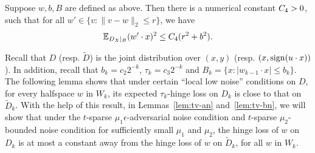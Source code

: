 \begin{lemma}
Suppose $w, b, B$ are defined as above. Then there is a numerical constant $C_4  > 0$, such that for all $w' \in \{v: \| v - w \|_2 \leq r \}$, we have
\begin{equation*}
 \mathbb{E}_{D_X|_B} (w' \cdot x)^2 \leq C_4 (r^2 + b^2).
\end{equation*}
\label{lem:variance}
\end{lemma}

Recall that $D$ (resp. $\tilde{D}$) is the joint distribution over $(x,y)$ (resp. $(x,\operatorname{sign}(u \cdot x))$). In addition, recall that $b_k = c_2 2^{-k}$, $\tau_k = c_3 2^{-k}$ and $B_k = \{ x: |w_{k-1} \cdot x| \leq b_k \}$.
The following lemma shows that under certain ``local low noise'' conditions on $D$, for every halfspace $w$ in $W_k$,
its expected $\tau_k$-hinge loss on $D_k$ is close to that on $\tilde{D}_k$. With the help of this result, in Lemmas~\ref{lem:tv-an} and~\ref{lem:tv-bn}, we will show that under the $t$-sparse $\mu_1 \epsilon$-adversarial noise condition and $t$-sparse $\mu_2$-bounded noise condition for sufficiently small $\mu_1$ and $\mu_2$,
the hinge loss of $w$ on $D_k$ is at most a constant away from the hinge loss of $w$ on $\tilde{D}_k$,
for all $w$ in $W_k$.


